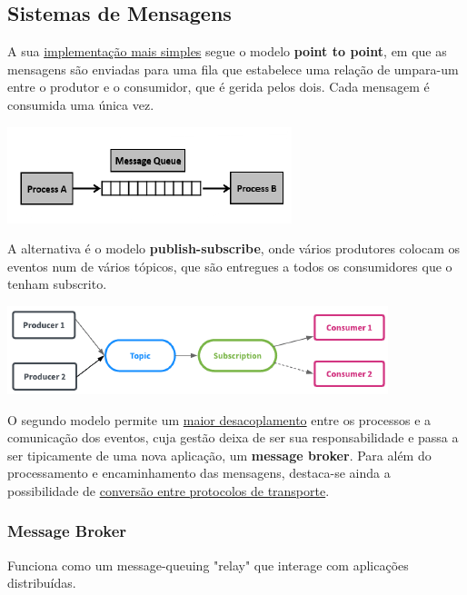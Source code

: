\documentclass{article}
\begin{document}
\pagebreak

\subsection{Sistemas de Mensagens}

A sua \uline{implementação mais simples} segue o modelo \textbf{point to point}, em que as
mensagens são enviadas para uma fila que estabelece uma relação de umpara-um entre o produtor e o consumidor, que é gerida pelos dois. Cada
mensagem é consumida uma única vez.

\begin{center}
  \includegraphics[scale=0.8]{108}
\end{center}

A alternativa é o modelo \textbf{publish-subscribe}, onde vários produtores colocam
os eventos num de vários tópicos, que são entregues a todos os
consumidores que o tenham subscrito.

\begin{center}
  \includegraphics[scale=0.8]{109}
\end{center}

O segundo modelo permite um \uline{maior desacoplamento} entre os processos e a comunicação
dos eventos, cuja gestão deixa de ser sua responsabilidade e passa a ser tipicamente de uma
nova aplicação, um \textbf{message broker}. Para além do processamento e encaminhamento das
mensagens, destaca-se ainda a possibilidade de \uline{conversão entre protocolos de transporte}.

\subsubsection{Message Broker}

Funciona como um message-queuing "relay" que interage com aplicações
distribuídas.

\vspace{2mm}
\end{document}
